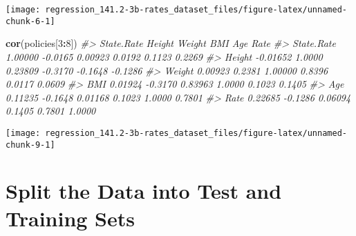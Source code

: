 \documentclass[]{book}
\newenvironment{Shaded}{\begin{snugshade}}{\end{snugshade}}
\newcommand{\CommentTok}[1]{\textcolor[rgb]{0.56,0.35,0.01}{\textit{#1}}}
\newcommand{\DataTypeTok}[1]{\textcolor[rgb]{0.13,0.29,0.53}{#1}}
\newcommand{\DecValTok}[1]{\textcolor[rgb]{0.00,0.00,0.81}{#1}}
\newcommand{\KeywordTok}[1]{\textcolor[rgb]{0.13,0.29,0.53}{\textbf{#1}}}
\newcommand{\NormalTok}[1]{#1}
\newcommand{\OperatorTok}[1]{\textcolor[rgb]{0.81,0.36,0.00}{\textbf{#1}}}
\begin{document}
\begin{center}\texttt{[image: regression\_141.2-3b-rates\_dataset\_files/figure-latex/unnamed-chunk-6-1]} \end{center}

\begin{Shaded}
\begin{Highlighting}[]
\KeywordTok{cor}\NormalTok{(policies[}\DecValTok{3}\OperatorTok{:}\DecValTok{8}\NormalTok{])}
\CommentTok{#>            State.Rate  Height  Weight     BMI     Age    Rate}
\CommentTok{#> State.Rate    1.00000 -0.0165 0.00923  0.0192  0.1123  0.2269}
\CommentTok{#> Height       -0.01652  1.0000 0.23809 -0.3170 -0.1648 -0.1286}
\CommentTok{#> Weight        0.00923  0.2381 1.00000  0.8396  0.0117  0.0609}
\CommentTok{#> BMI           0.01924 -0.3170 0.83963  1.0000  0.1023  0.1405}
\CommentTok{#> Age           0.11235 -0.1648 0.01168  0.1023  1.0000  0.7801}
\CommentTok{#> Rate          0.22685 -0.1286 0.06094  0.1405  0.7801  1.0000}
\end{Highlighting}
\end{Shaded}

\begin{Shaded}
\end{Shaded}

\begin{Shaded}
\end{Shaded}

\begin{center}\texttt{[image: regression\_141.2-3b-rates\_dataset\_files/figure-latex/unnamed-chunk-9-1]} \end{center}

\hypertarget{split-the-data-into-test-and-training-sets}{%
\section{Split the Data into Test and Training Sets}\label{split-the-data-into-test-and-training-sets}}
\end{document}

